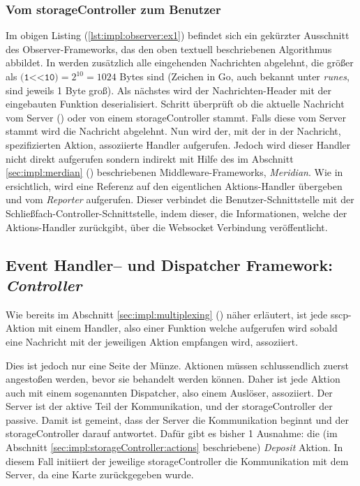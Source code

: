 \subsubsection{Vom \gls{storageController} zum Benutzer}
Im obigen Listing (\ref{lst:impl:observer:ex1}) befindet sich ein gekürzter Ausschnitt des Observer-Frameworks, das den oben textuell beschriebenen Algorithmus abbildet. In  werden zusätzlich alle eingehenden Nachrichten abgelehnt, die größer als $\texttt{(1<<10)}=2^{10}=1024$ Bytes sind (Zeichen in Go, auch bekannt unter \textit{runes}, sind jeweils 1 Byte groß). Als nächstes  wird der Nachrichten-Header mit der eingebauten  Funktion deserialisiert. Schritt  überprüft ob die aktuelle Nachricht vom Server () oder von einem \gls{storageController} stammt. Falls diese vom Server stammt wird die Nachricht abgelehnt. Nun  wird der, mit der in der Nachricht, spezifizierten Aktion, assoziierte Handler aufgerufen. Jedoch wird dieser Handler nicht direkt aufgerufen  sondern indirekt mit Hilfe des im Abschnitt \ref{sec:impl:merdian} () beschriebenen Middleware-Frameworks, \textit{Meridian}. Wie in  ersichtlich, wird eine Referenz auf den eigentlichen Aktions-Handler übergeben und vom \textit{Reporter} aufgerufen. Dieser verbindet die Benutzer-Schnittstelle mit der Schließfach-Controller-Schnittstelle, indem dieser, die Informationen, welche der Aktions-Handler zurückgibt, über die Websocket Verbindung veröffentlicht. 

\newpage
\subsection{Event Handler-- und Dispatcher Framework: \textit{Controller}}\label{sec:impl:event-handler-dispatcher-system}
Wie bereits im Abschnitt \ref{sec:impl:multiplexing} () näher erläutert, ist jede \acrshort{sscp}-Aktion mit einem Handler, also einer Funktion welche aufgerufen wird sobald eine Nachricht mit der jeweiligen Aktion empfangen wird, assoziiert.\bigskip

\noindent
Dies ist jedoch nur eine Seite der Münze. Aktionen müssen schlussendlich zuerst angestoßen werden, bevor sie behandelt werden können. Daher ist jede Aktion auch mit einem sogenannten Dispatcher, also einem Auslöser, assoziiert. Der Server ist der aktive Teil der Kommunikation, und der \gls{storageController} der passive. Damit ist gemeint, dass der Server die Kommunikation beginnt und der \gls{storageController} darauf antwortet. Dafür gibt es bisher 1 Ausnahme: die (im Abschnitt \ref{sec:impl:storageController:actions} beschriebene) \textit{Deposit} Aktion. In diesem Fall initiiert der jeweilige \gls{storageController} die Kommunikation mit dem Server, da eine Karte zurückgegeben wurde.\bigskip

